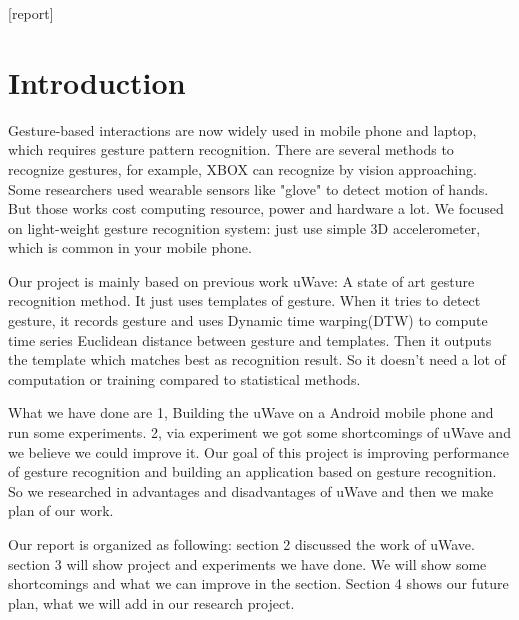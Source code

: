 \documentclass{acm_proc_article-sp}
\begin{document}
[report]



\section{Introduction}
Gesture-based interactions are now widely used in mobile phone and laptop, which requires gesture pattern recognition. There are several methods to recognize gestures, for example, XBOX can recognize by vision approaching. Some researchers used wearable sensors like "glove" to detect motion of hands. But those works cost computing resource, power and hardware a lot. We focused on light-weight gesture recognition system: just use simple 3D accelerometer, which is common in your mobile phone.

Our project is mainly based on previous work uWave\cite{liu2009uwave}: A state of art gesture recognition method. It just uses templates of gesture. When it tries to detect gesture, it records gesture and uses Dynamic time warping(DTW) to compute time series Euclidean distance between gesture and templates. Then it outputs the template which matches best as recognition result. So it doesn't need a lot of computation or training compared to statistical methods.

What we have done are 1, Building the uWave on a Android mobile phone and run some experiments. 2, via experiment we got some shortcomings of uWave and we believe we could improve it. Our goal of this project is improving performance of gesture recognition and building an application based on gesture recognition. So we researched in advantages and disadvantages of uWave and then we make plan of our work.

Our report is organized as following: section 2 discussed the work of uWave. section 3 will show project and experiments we have done. We will show some shortcomings and what we can improve in the section. Section 4 shows our future plan, what we will add in our research project.
\end{document}
